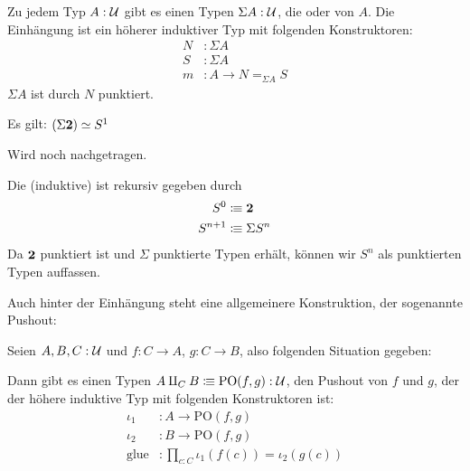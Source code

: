 \begin{regeln}[Einhängung]
  Zu jedem Typ $A:\mathcal{U}$ gibt es einen Typen $\Sigma A:\mathcal{U}$, die  oder  von $A$.
  Die Einhängung ist ein höherer induktiver Typ mit folgenden Konstruktoren:
  \begin{align*}
    N&:\Sigma A \\
    S&:\Sigma A \\
    m&:A\to N=_{\Sigma A}S
  \end{align*}
  $\Sigma A$ ist durch $N$ punktiert.
\end{regeln}

\begin{bemerkung}
  Es gilt: $(\Sigma\mathbf{2})\simeq S^1$
\end{bemerkung}
\begin{beweis}
  Wird noch nachgetragen.
\end{beweis}

\begin{definition}
  Die (induktive)  ist rekursiv gegeben durch
  \begin{align*}
    S^0&\vcentcolon\mspace{-1.2mu}\equiv \mathbf{2} \\
    S^{n+1}&\vcentcolon\mspace{-1.2mu}\equiv \Sigma S^n
  \end{align*}
  Da $\mathbf{2}$ punktiert ist und $\Sigma$ punktierte Typen erhält, können wir $S^n$ als punktierten Typen auffassen.
\end{definition}

Auch hinter der Einhängung steht eine allgemeinere Konstruktion, der sogenannte Pushout:

\begin{regeln}[Pushout]
  Seien $A,B,C:\mathcal{U}$ und $f:C\to A$, $g:C\to B$, also folgenden Situation gegeben:
  \begin{center}
  \end{center}
  Dann gibt es einen Typen $A\amalg_C B\vcentcolon\mspace{-1.2mu}\equiv \mathrm{PO}(f,g):\mathcal{U}$, den Pushout von $f$ und $g$, der der höhere induktive Typ mit folgenden Konstruktoren ist:
  \begin{align*}
    \iota_1&:A\to \mathrm{PO}(f,g) \\
    \iota_2&:B\to \mathrm{PO}(f,g) \\
    \mathrm{glue}&:\prod_{c:C}\iota_1(f(c))=\iota_2(g(c))
  \end{align*}
\end{regeln}

